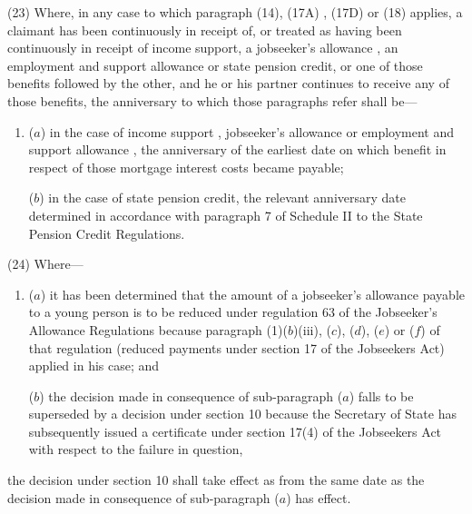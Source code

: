 \documentclass[12pt,a4paper]{article}
\begin{document}
(23) Where, in any case to which paragraph (14), (17A)%
, (17D)  %
or (18) applies, a claimant has been continuously in receipt of, or treated as having been continuously in receipt of income support, a jobseeker’s allowance%
, an employment and support allowance  %
or state pension credit, or one of those benefits followed by the other, and he or his partner continues to receive any of those benefits, the anniversary to which those paragraphs refer shall be—
\begin{enumerate}\item[]
($a$) in the case of income support%
, jobseeker’s allowance or employment and support allowance%
, the anniversary of the earliest date on which benefit in respect of those mortgage interest costs became payable;

($b$) in the case of state pension credit, the relevant anniversary date determined in accordance with paragraph 7 of Schedule II to the State Pension Credit Regulations.
\end{enumerate}

(24) Where—
\begin{enumerate}\item[]
($a$) it has been determined that the amount of a jobseeker’s allowance payable to a young person is to be reduced under regulation 63 of the Jobseeker’s Allowance Regulations because paragraph (1)($b$)(iii), ($c$), ($d$), ($e$) or ($f$) of that regulation (reduced payments under section 17 of the Jobseekers Act) applied in his case; and

($b$) the decision made in consequence of sub-paragraph ($a$) falls to be superseded by a decision under section 10 because the Secretary of State has subsequently issued a certificate under section 17(4) of the Jobseekers Act with respect to the failure in question,
\end{enumerate}
the decision under section 10 shall take effect as from the same date as the decision made in consequence of sub-paragraph ($a$) has effect.

\end{document}
